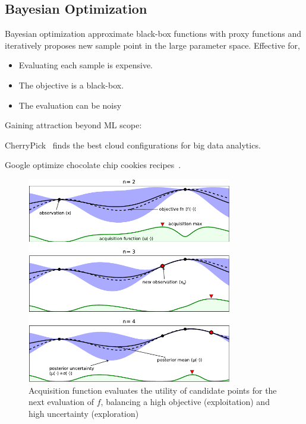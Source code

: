 \subsection{Bayesian Optimization}
\label{sec:bo}

Bayesian optimization approximate black-box functions with proxy functions and
iteratively proposes new sample point in the large parameter space. Effective
for,

\begin{itemize}
\item Evaluating each sample is expensive.
\item The objective is a black-box.
\item The evaluation can be noisy
\end{itemize}

Gaining attraction beyond ML scope:
\item CherryPick~\cite{alipourfard2017cherrypick} finds the best cloud
  configurations for big data analytics.
\item Google optimize chocolate chip cookies recipes~\cite{solnik2017bayesian}.

\begin{figure}
  \centering
  \includegraphics[width=0.8\textwidth]{figures/serving-bo-illustration.pdf}
  \caption{Acquisition function evaluates the utility of candidate points for
    the next evaluation of $f$, balancing a high objective (exploitation) and
    high uncertainty (exploration)~\cite{shahriari2016taking}}
\end{figure}

